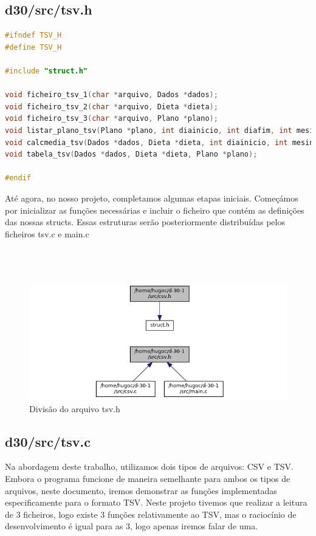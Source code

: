 \documentclass[a4wide]{report}
\begin{document}
\subsection{d30/src/tsv.h}
\begin{lstlisting}[language=C, caption={listar plano tsv}, label={codigo:c}, breaklines=true, basicstyle=\small]
#ifndef TSV_H
#define TSV_H

#include "struct.h"

void ficheiro_tsv_1(char *arquivo, Dados *dados);
void ficheiro_tsv_2(char *arquivo, Dieta *dieta);
void ficheiro_tsv_3(char *arquivo, Plano *plano);
void listar_plano_tsv(Plano *plano, int diainicio, int diafim, int mesinicio, int mesfim);
void calcmedia_tsv(Dados *dados, Dieta *dieta, int diainicio, int mesinicio, int diafim, int mesfim);
void tabela_tsv(Dados *dados, Dieta *dieta, Plano *plano);

#endif
\end{lstlisting}
Até agora, no nosso projeto, completamos algumas etapas iniciais. Começámos por inicializar as funções necessárias e incluir o ficheiro que contém as definições das nossas structs. Essas estruturas serão posteriormente distribuídas pelos ficheiros tsv.c e main.c
\\
\\
\\
\\
\begin{figure}[h]
    \centering
    \includegraphics[width=0.8\linewidth]{tsv.h.png}
    \caption{Divisão do arquivo tsv.h}
    \label{fig:divisaotsv}
\end{figure}

\subsection{d30/src/tsv.c}
Na abordagem deste trabalho, utilizamos dois tipos de arquivos: CSV  e TSV. Embora o programa funcione de maneira semelhante para ambos os tipos de arquivos, neste documento, iremos demonstrar as funções implementadas especificamente para o formato TSV. Neste projeto tivemos que realizar a leitura de 3 ficheiros, logo existe 3 funções relativamente ao TSV, mas o raciocínio de desenvolvimento é igual para as 3, logo apenas iremos falar de uma.
\\
\end{document}
